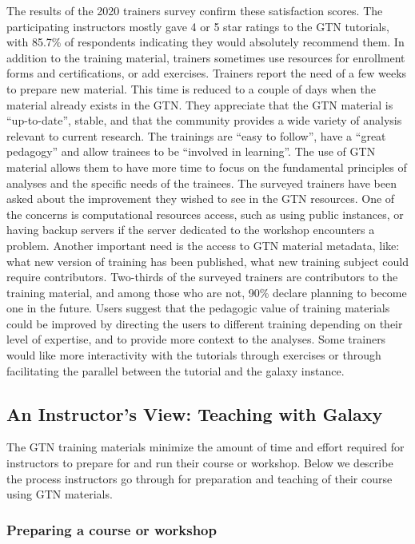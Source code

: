 \documentclass[10pt,letterpaper]{article}
\begin{document}
The results of the 2020 trainers survey confirm these satisfaction scores. The participating instructors mostly gave 4 or 5 star ratings to the GTN tutorials, with 85.7\% of respondents indicating they would absolutely recommend them.
In addition to the training material, trainers sometimes use resources for enrollment forms and certifications, or add exercises.
Trainers report the need of a few weeks to prepare new material.
This time is reduced to a couple of days when the material already exists in the GTN\@.
They appreciate that the GTN material is “up-to-date”, stable, and that the community provides a wide variety of analysis relevant to current research.
The trainings are “easy to follow”, have a “great pedagogy” and allow trainees to be “involved in learning”.
The use of GTN material allows them to have more time to focus on the fundamental principles of  analyses and the specific needs of the trainees.
The surveyed trainers have been asked about the improvement they wished to see in the GTN resources.
One of the concerns is computational resources access, such as using public instances, or having backup servers if the server dedicated to the workshop encounters a problem.
Another important need is the access to GTN material metadata, like:  what new version of training has been published, what new training subject could require contributors.
Two-thirds of the surveyed trainers are contributors to the training material, and among those who are not, 90\% declare planning to become one in the future.
Users suggest that the pedagogic value of training materials could be improved by directing the users to different training depending on their level of expertise, and to provide more context to the analyses.
Some trainers would like more interactivity with the tutorials through exercises or through facilitating the parallel between the tutorial and the galaxy instance.


\subsection*{An Instructor's View: Teaching with Galaxy}

The GTN training materials minimize the amount of time and effort required for instructors to prepare for and run their course or workshop. Below we describe the process instructors go through for preparation and teaching of their course using GTN materials.


\subsubsection*{Preparing a course or workshop}
\end{document}
